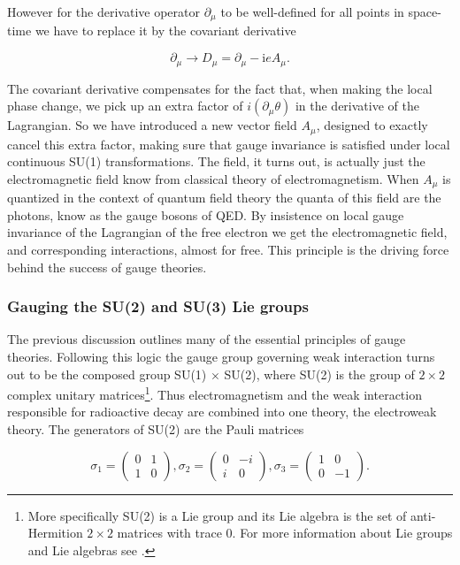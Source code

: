 However for the derivative operator $\partial_\mu$ to be well-defined for all points in space-time we have to replace it by the covariant derivative

\begin{equation} \label{eq:covariant}
	\partial_\mu \rightarrow D_\mu = \partial_\mu - \textrm{i}e A_\mu.
\end{equation}

The covariant derivative compensates for the fact that, when making the local phase change, we pick up an extra factor of $i (\partial_\mu \theta)$ in the derivative of the Lagrangian. So we have introduced a new vector field $A_\mu$, designed to exactly cancel this extra factor, making sure that gauge invariance is satisfied under local continuous SU(1) transformations. The field, it turns out, is actually just the electromagnetic field know from classical theory of electromagnetism. When $A_\mu$ is quantized in the context of quantum field theory the quanta of this field are the photons, know as the gauge bosons of QED. By insistence on local gauge invariance of the Lagrangian of the free electron we get the electromagnetic field, and corresponding interactions, almost for free. This principle is the driving force behind the success of gauge theories.

\subsubsection{Gauging the SU(2) and SU(3) Lie groups}
The previous discussion outlines many of the essential principles of gauge theories. Following this logic the gauge group governing weak interaction turns out to be the composed group SU(1) $\times$ SU(2), where SU(2) is the group of $2 \times 2$ complex unitary matrices\footnote{More specifically SU(2) is a Lie group and its Lie algebra is the set of anti-Hermition $2 \times 2$ matrices with trace 0. For more information about Lie groups and Lie algebras see  \cite{fulton1991rtf}.}. Thus electromagnetism and the weak interaction responsible for radioactive decay are combined into one theory, the electroweak theory. The generators of SU(2) are the Pauli matrices

\begin{equation}
	\sigma_1 =
	\begin{pmatrix}
	0&1\\
	1&0
	\end{pmatrix},
	\sigma_2 = 
	\begin{pmatrix}
	0&-i\\
	i&0
	\end{pmatrix},
	\sigma_3 = 
	\begin{pmatrix}
	1&0\\
	0&-1
	\end{pmatrix}.
\end{equation}

